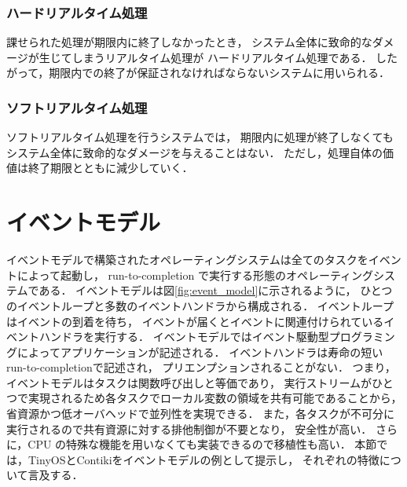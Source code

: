 \subsubsection{ハードリアルタイム処理}

\vspace{0.5em}課せられた処理が期限内に終了しなかったとき，
システム全体に致命的なダメージが生じてしまうリアルタイム処理が
ハードリアルタイム処理である．
したがって，期限内での終了が保証されなければならないシステムに用いられる．

\subsubsection{ソフトリアルタイム処理}

\vspace{0.5em}ソフトリアルタイム処理を行うシステムでは，
期限内に処理が終了しなくてもシステム全体に致命的なダメージを与えることはない．
ただし，処理自体の価値は終了期限とともに減少していく．






\section{イベントモデル}
イベントモデルで構築されたオペレーティングシステムは全てのタスクをイベントによって起動し，
run-to-completion で実行する形態のオペレーティングシステムである．
イベントモデルは図\ref{fig:event_model}に示されるように，
ひとつのイベントループと多数のイベントハンドラから構成される．
イベントループはイベントの到着を待ち，
イベントが届くとイベントに関連付けられているイベントハンドラを実行する．
イベントモデルではイベント駆動型プログラミングによってアプリケーションが記述される．
イベントハンドラは寿命の短いrun-to-completionで記述され，
プリエンプションされることがない．
つまり，イベントモデルはタスクは関数呼び出しと等価であり，
実行ストリームがひとつで実現されるため各タスクでローカル変数の領域を共有可能であることから，
省資源かつ低オーバヘッドで並列性を実現できる．
また，各タスクが不可分に実行されるので共有資源に対する排他制御が不要となり，
安全性が高い．
さらに，CPU の特殊な機能を用いなくても実装できるので移植性も高い．
本節では，TinyOSとContikiをイベントモデルの例として提示し，
それぞれの特徴について言及する．



